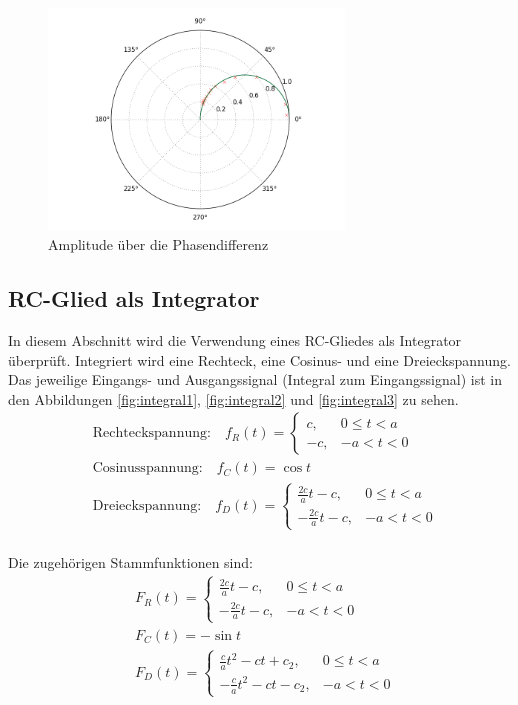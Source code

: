 \begin{figure}[h!]
	\centering
	\includegraphics[width=0.7\textwidth]{Phasenverschub2.png}
	\caption{Amplitude über die Phasendifferenz}
	\label{fig:phasenverschub2}
\end{figure} 



\clearpage
\subsection{RC-Glied als Integrator}
In diesem Abschnitt wird die Verwendung eines RC-Gliedes als Integrator überprüft. Integriert wird eine Rechteck, eine Cosinus- und eine Dreieckspannung. Das jeweilige Eingangs- und Ausgangssignal (Integral zum Eingangssignal) ist in den Abbildungen \ref{fig:integral1}, \ref{fig:integral2} und \ref{fig:integral3} zu sehen.
\begin{align}
	&\text{Rechteckspannung:} \quad f_R(t) = \begin{cases}
		c, & 0\leq t < a \\
		-c, & -a < t < 0
	\end{cases} \\
&\text{Cosinusspannung:} \quad f_C(t) = \cos{t} \\
	&\text{Dreieckspannung:} \quad f_D(t) = \begin{cases}
		\frac{2c}{a} t-c, & 0\leq t < a \\
	-\frac{2c}{a} t-c, & -a < t < 0
	\end{cases} \\
\end{align}

Die zugehörigen Stammfunktionen sind:
\begin{align}
	&F_R(t) = \begin{cases}
		\frac{2c}{a} t - c, & 0\leq t < a \\
		-\frac{2c}{a} t - c, & -a < t < 0
	\end{cases} \\
	&F_C(t) = -\sin{t} \\
	&F_D(t) = \begin{cases}
		\frac{c}{a} t^2-ct + c_2, & 0\leq t < a \\
		-\frac{c}{a} t^2-ct - c_2, & -a < t < 0
	\end{cases} \\
\end{align}


